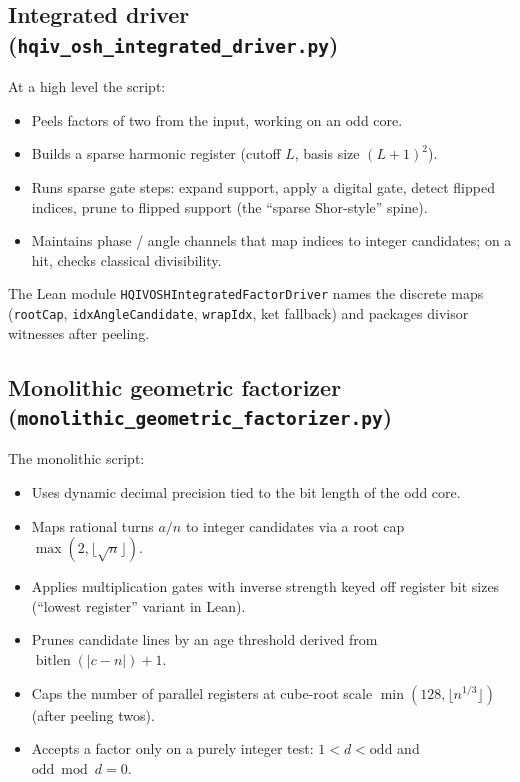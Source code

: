 \documentclass[11pt,a4paper]{article}
\newcommand{\bitlen}{\operatorname{bitlen}}
\theoremstyle{plain}
\theoremstyle{definition}
\theoremstyle{remark}
\begin{document}
\subsection{Integrated driver (\texttt{hqiv\_osh\_integrated\_driver.py})}

At a high level the script:
\begin{itemize}
\item Peels factors of two from the input, working on an odd core.
\item Builds a sparse harmonic register (cutoff $L$, basis size $(L{+}1)^2$).
\item Runs sparse gate steps: expand support, apply a digital gate, detect flipped
      indices, prune to flipped support (the ``sparse Shor-style'' spine).
\item Maintains phase / angle channels that map indices to integer candidates; on a
      hit, checks classical divisibility.
\end{itemize}

The Lean module \texttt{HQIVOSHIntegratedFactorDriver} names the discrete maps
(\texttt{rootCap}, \texttt{idxAngleCandidate}, \texttt{wrapIdx}, ket fallback) and
packages divisor witnesses after peeling.

\subsection{Monolithic geometric factorizer (\texttt{monolithic\_geometric\_factorizer.py})}

The monolithic script:
\begin{itemize}
\item Uses dynamic decimal precision tied to the bit length of the odd core.
\item Maps rational turns $a/n$ to integer candidates via a root cap
      $\max(2,\lfloor\sqrt{n}\rfloor)$.
\item Applies multiplication gates with inverse strength keyed off register bit sizes
      (``lowest register'' variant in Lean).
\item Prunes candidate lines by an age threshold derived from
      $\bitlen(|c-n|)+1$.
\item Caps the number of parallel registers at cube-root scale
      $\min(128,\lfloor n^{1/3}\rfloor)$ (after peeling twos).
\item Accepts a factor only on a purely integer test: $1<d<\text{odd}$ and
      $\text{odd}\bmod d = 0$.
\end{itemize}
\end{document}
